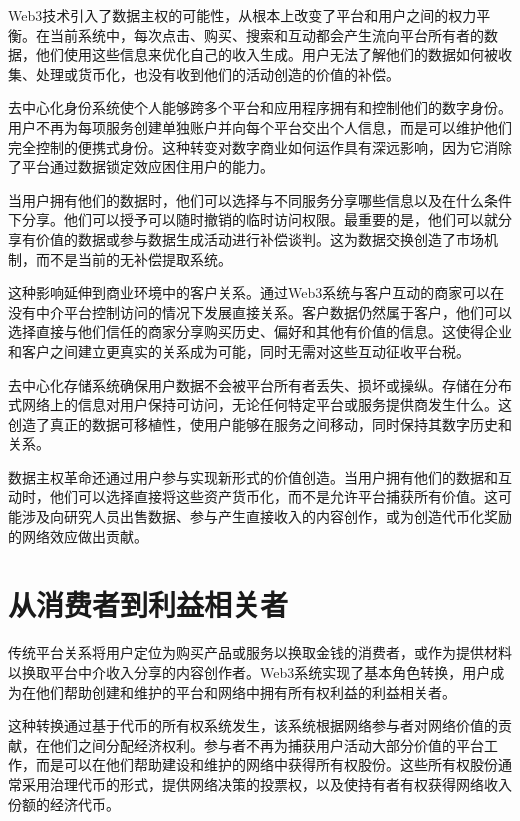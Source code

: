 \documentclass[
  Letterpaper,
]{scrbook}
\begin{document}
Web3技术引入了数据主权的可能性，从根本上改变了平台和用户之间的权力平衡。在当前系统中，每次点击、购买、搜索和互动都会产生流向平台所有者的数据，他们使用这些信息来优化自己的收入生成。用户无法了解他们的数据如何被收集、处理或货币化，也没有收到他们的活动创造的价值的补偿。

去中心化身份系统使个人能够跨多个平台和应用程序拥有和控制他们的数字身份。用户不再为每项服务创建单独账户并向每个平台交出个人信息，而是可以维护他们完全控制的便携式身份。这种转变对数字商业如何运作具有深远影响，因为它消除了平台通过数据锁定效应困住用户的能力。

当用户拥有他们的数据时，他们可以选择与不同服务分享哪些信息以及在什么条件下分享。他们可以授予可以随时撤销的临时访问权限。最重要的是，他们可以就分享有价值的数据或参与数据生成活动进行补偿谈判。这为数据交换创造了市场机制，而不是当前的无补偿提取系统。

这种影响延伸到商业环境中的客户关系。通过Web3系统与客户互动的商家可以在没有中介平台控制访问的情况下发展直接关系。客户数据仍然属于客户，他们可以选择直接与他们信任的商家分享购买历史、偏好和其他有价值的信息。这使得企业和客户之间建立更真实的关系成为可能，同时无需对这些互动征收平台税。

去中心化存储系统确保用户数据不会被平台所有者丢失、损坏或操纵。存储在分布式网络上的信息对用户保持可访问，无论任何特定平台或服务提供商发生什么。这创造了真正的数据可移植性，使用户能够在服务之间移动，同时保持其数字历史和关系。

数据主权革命还通过用户参与实现新形式的价值创造。当用户拥有他们的数据和互动时，他们可以选择直接将这些资产货币化，而不是允许平台捕获所有价值。这可能涉及向研究人员出售数据、参与产生直接收入的内容创作，或为创造代币化奖励的网络效应做出贡献。

\section{从消费者到利益相关者}\label{ux4eceux6d88ux8d39ux8005ux5230ux5229ux76caux76f8ux5173ux8005}

传统平台关系将用户定位为购买产品或服务以换取金钱的消费者，或作为提供材料以换取平台中介收入分享的内容创作者。Web3系统实现了基本角色转换，用户成为在他们帮助创建和维护的平台和网络中拥有所有权利益的利益相关者。

这种转换通过基于代币的所有权系统发生，该系统根据网络参与者对网络价值的贡献，在他们之间分配经济权利。参与者不再为捕获用户活动大部分价值的平台工作，而是可以在他们帮助建设和维护的网络中获得所有权股份。这些所有权股份通常采用治理代币的形式，提供网络决策的投票权，以及使持有者有权获得网络收入份额的经济代币。
\end{document}
